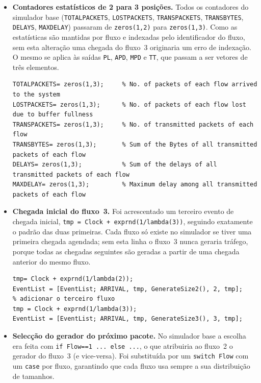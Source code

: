 \documentclass[11pt,a4paper]{article}
\begin{document}
\begin{itemize}
    \item \textbf{Contadores estatísticos de 2 para 3 posições.} Todos os
    contadores do simulador base (\texttt{TOTALPACKETS}, \texttt{LOSTPACKETS},
    \texttt{TRANSPACKETS}, \texttt{TRANSBYTES}, \texttt{DELAYS},
    \texttt{MAXDELAY}) passaram de \lstinline|zeros(1,2)| para
    \lstinline|zeros(1,3)|. Como as estatísticas são mantidas por fluxo e
    indexadas pelo identificador do fluxo, sem esta alteração uma chegada do
    fluxo~3 originaria um erro de indexação. O mesmo se aplica às saídas
    \texttt{PL}, \texttt{APD}, \texttt{MPD} e \texttt{TT}, que passam a ser
    vetores de três elementos.

    \begin{lstlisting}[basicstyle=\ttfamily\scriptsize]
TOTALPACKETS= zeros(1,3);     % No. of packets of each flow arrived to the system
LOSTPACKETS= zeros(1,3);      % No. of packets of each flow lost due to buffer fullness
TRANSPACKETS= zeros(1,3);     % No. of transmitted packets of each flow
TRANSBYTES= zeros(1,3);       % Sum of the Bytes of all transmitted packets of each flow
DELAYS= zeros(1,3);           % Sum of the delays of all transmitted packets of each flow
MAXDELAY= zeros(1,3);         % Maximum delay among all transmitted packets of each flow
    \end{lstlisting}

    \item \textbf{Chegada inicial do fluxo~3.} Foi acrescentado um terceiro
    evento de chegada inicial,
    \lstinline|tmp = Clock + exprnd(1/lambda(3))|, seguindo exatamente o
    padrão das duas primeiras. Cada fluxo só existe no simulador se tiver uma
    primeira chegada agendada; sem esta linha o fluxo~3 nunca geraria tráfego,
    porque todas as chegadas seguintes são geradas a partir de uma chegada
    anterior do mesmo fluxo.

    \begin{lstlisting}[basicstyle=\ttfamily\scriptsize]
tmp= Clock + exprnd(1/lambda(2));
EventList = [EventList; ARRIVAL, tmp, GenerateSize2(), 2, tmp];
% adicionar o terceiro fluxo
tmp = Clock + exprnd(1/lambda(3));
EventList = [EventList; ARRIVAL, tmp, GenerateSize3(), 3, tmp];
    \end{lstlisting}

    \item \textbf{Selecção do gerador do próximo pacote.} No simulador base a
    escolha era feita com \lstinline|if Flow==1 ... else ...|, o que atribuiria
    ao fluxo~2 o gerador do fluxo~3 (e vice-versa). Foi substituída por um
    \lstinline|switch Flow| com um \lstinline|case| por fluxo, garantindo que
    cada fluxo usa sempre a sua distribuição de tamanhos.


\end{itemize}
\end{document}
